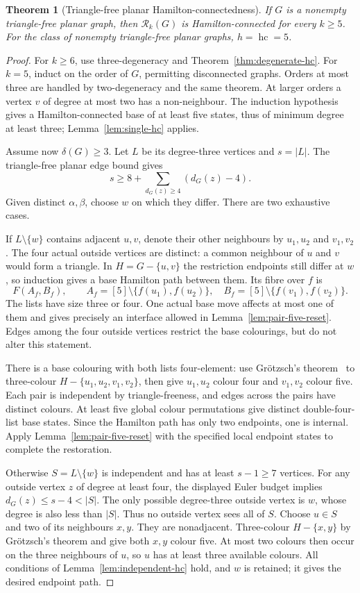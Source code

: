 \documentclass[11pt]{article}
\newtheorem{theorem}{Theorem}[section]
\theoremstyle{remark}
\newcommand{\Rk}{\mathcal R_k}
\newcommand{\hc}{\operatorname{hc}}
\numberwithin{equation}{section}
\begin{document}
\begin{theorem}[Triangle-free planar Hamilton-connectedness]
\label{thm:trianglefree-hc}
If $G$ is a nonempty triangle-free planar graph, then $\Rk(G)$ is
Hamilton-connected for every $k\ge5$.  For the class of nonempty
triangle-free planar graphs,
$h=\hc=5$.
\end{theorem}

\begin{proof}
For $k\ge6$, use three-degeneracy and
Theorem~\ref{thm:degenerate-hc}.  For $k=5$, induct on the order of
$G$, permitting disconnected graphs.  Orders at most three are handled
by two-degeneracy and the same theorem.  At larger orders a vertex $v$
of degree at most two has a non-neighbour.  The induction hypothesis
gives a Hamilton-connected base of at least five states, thus of minimum
degree at least three; Lemma~\ref{lem:single-hc} applies.

Assume now $\delta(G)\ge3$.  Let $L$ be its degree-three vertices
and $s=|L|$.  The triangle-free planar edge bound gives
\[
 s\ge8+\sum_{d_G(z)\ge4}(d_G(z)-4).
\]
Given distinct $\alpha,\beta$, choose $w$ on which they differ.
There are two exhaustive cases.

If $L\setminus\{w\}$ contains adjacent $u,v$, denote their other
neighbours by $u_1,u_2$ and $v_1,v_2$.  The four actual outside
vertices are distinct: a common neighbour of $u$ and $v$ would form
a triangle.  In $H=G-\{u,v\}$ the restriction endpoints still differ
at $w$, so induction gives a base Hamilton path between them.  Its
fibre over $f$ is
\[
 F(A_f,B_f),\qquad
 A_f=[5]\setminus\{f(u_1),f(u_2)\},\quad
 B_f=[5]\setminus\{f(v_1),f(v_2)\}.
\]
The lists have size three or four.  One actual base move affects at
most one of them and gives precisely an interface allowed in
Lemma~\ref{lem:pair-five-reset}.  Edges among the four outside
vertices restrict the base colourings, but do not alter this statement.

There is a base colouring with both lists four-element: use
Gr\"otzsch's theorem~\cite{Grotzsch59} to three-colour
$H-\{u_1,u_2,v_1,v_2\}$, then give $u_1,u_2$ colour four and
$v_1,v_2$ colour five.  Each pair is independent by triangle-freeness,
and edges across the pairs have distinct colours.  At least five global
colour permutations give distinct double-four-list base states.  Since
the Hamilton path has only two endpoints, one is internal.  Apply
Lemma~\ref{lem:pair-five-reset} with the specified local endpoint
states to complete the restoration.

Otherwise $S=L\setminus\{w\}$ is independent and has at least
$s-1\ge7$ vertices.  For any outside vertex $z$ of degree at least
four, the displayed Euler budget implies $d_G(z)\le s-4<|S|$.
The only possible degree-three outside vertex is $w$, whose degree is
also less than $|S|$.  Thus no outside vertex sees all of $S$.
Choose $u\in S$ and two of its neighbours $x,y$.  They are
nonadjacent.  Three-colour $H-\{x,y\}$ by Gr\"otzsch's theorem
and give both $x,y$ colour five.  At most two colours then occur on the
three neighbours of $u$, so $u$ has at least three available colours.
All conditions of Lemma~\ref{lem:independent-hc} hold, and $w$ is
retained; it gives the desired endpoint path.


\end{proof}
\end{document}
